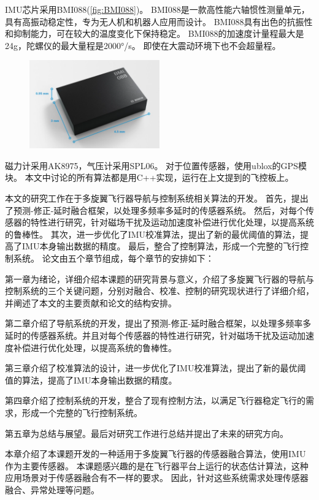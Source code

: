 \documentclass[
  type=master
]{gdutthesis}
\begin{document}
IMU芯片采用BMI088(\autoref{fig:BMI088})。
BMI088是一款高性能六轴惯性测量单元，具有高振动稳定性，专为无人机和机器人应用而设计。
BMI088具有出色的抗振性和抑制能力，可在较大的温度变化下保持稳定。
BMI088的加速度计量程最大是24g，陀螺仪的最大量程是2000°/s。
即使在大震动环境下也不会超量程。
\begin{figure}[H]
	\centering
	\includegraphics[width=0.5\textwidth]{屏幕截图 2022-03-30 151212.png}
	\label{fig:BMI088}
\end{figure}

磁力计采用AK8975，气压计采用SPL06。
对于位置传感器，使用ublox的GPS模块。
本文中讨论的所有算法都是用C++实现，运行在上文提到的飞控板上。

本文的研究工作在于多旋翼飞行器导航与控制系统相关算法的开发。
首先，提出了预测-修正-延时融合框架，以处理多频率多延时的传感器系统。
然后，对每个传感器的特性进行研究，针对磁场干扰及运动加速度补偿进行优化处理，以提高系统的鲁棒性。
其次，进一步优化了IMU校准算法，提出了新的最优阈值的算法，提高了IMU本身输出数据的精度。
最后，整合了控制算法，形成一个完整的飞行控制系统。
论文由五个章节组成，每个章节的安排如下：

第一章为绪论，详细介绍本课题的研究背景与意义，介绍了多旋翼飞行器的导航与控制系统的三个关键问题，分别对融合、校准、控制的研究现状进行了详细介绍，并阐述了本文的主要贡献和论文的结构安排。

第二章介绍了导航系统的开发，提出了预测-修正-延时融合框架，以处理多频率多延时的传感器系统。并且对每个传感器的特性进行研究，针对磁场干扰及运动加速度补偿进行优化处理，以提高系统的鲁棒性。

第三章介绍了校准算法的设计，进一步优化了IMU校准算法，提出了新的最优阈值的算法，提高了IMU本身输出数据的精度。

第四章介绍了控制系统的开发，整合了现有控制方法，以满足飞行器稳定飞行的需求，形成一个完整的飞行控制系统。

第五章为总结与展望。最后对研究工作进行总结并提出了未来的研究方向。

本章介绍了本课题开发的一种适用于多旋翼飞行器的传感器融合算法，使用IMU作为主要传感器。
本课题感兴趣的是在飞行器平台上运行的状态估计算法，这种应用场景对于传感器融合有不一样的要求。
因此，针对这些系统需求处理传感器融合、异常处理等问题。
\end{document}
